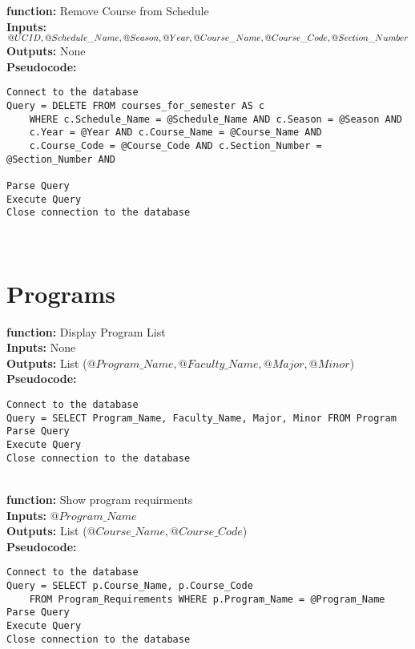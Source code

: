 \documentclass[11pt]{article} %
\begin{document}
\textbf{function:} Remove Course from Schedule \\
\textbf{Inputs:} $@UCID, @Schedule\_Name, @Season, @Year, @Course\_Name, \\
 @Course\_Code, @Section\_Number$ \\
\textbf{Outputs:} None\\
\textbf{Pseudocode:} 
\begin{verbatim}
Connect to the database
Query = DELETE FROM courses_for_semester AS c
    WHERE c.Schedule_Name = @Schedule_Name AND c.Season = @Season AND
    c.Year = @Year AND c.Course_Name = @Course_Name AND
    c.Course_Code = @Course_Code AND c.Section_Number = @Section_Number AND
 
Parse Query
Execute Query
Close connection to the database
\end{verbatim} \\
\section{Programs}

\textbf{function:} Display Program List\\
\textbf{Inputs:} None\\
\textbf{Outputs:} List ($@Program\_Name, @Faculty\_Name, @Major, @Minor$)\\
\textbf{Pseudocode:} 
\begin{verbatim}
Connect to the database
Query = SELECT Program_Name, Faculty_Name, Major, Minor FROM Program
Parse Query
Execute Query
Close connection to the database
\end{verbatim} \\
\textbf{function:} Show program requirments\\
\textbf{Inputs:} $@Program\_Name$\\
\textbf{Outputs:} List ($@Course\_Name, @Course\_Code$)\\
\textbf{Pseudocode:} 
\begin{verbatim}
Connect to the database
Query = SELECT p.Course_Name, p.Course_Code 
    FROM Program_Requirements WHERE p.Program_Name = @Program_Name
Parse Query
Execute Query
Close connection to the database
\end{verbatim} \\
\newpage
\end{document}
